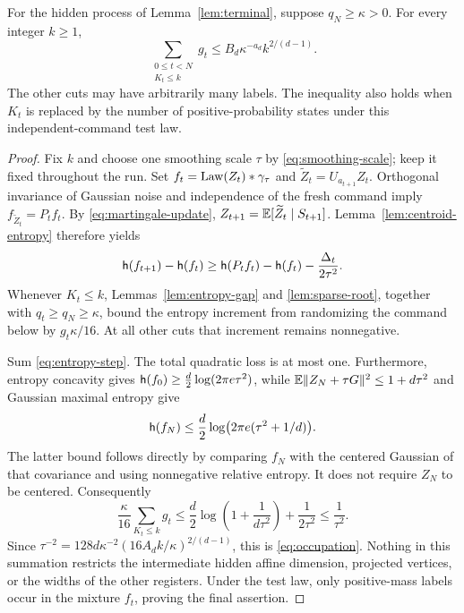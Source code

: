 \begin{theorem}
\label{thm:occupation}
For the hidden process of Lemma~\ref{lem:terminal}, suppose
$q_N\ge\kappa>0$. For every integer $k\ge1$,
\begin{equation}\label{eq:occupation}
 \sum_{\substack{0\le t<N\\K_t\le k}}g_t
       \le B_d\kappa^{-a_d}k^{2/(d-1)}.
\end{equation}
The other cuts may have arbitrarily many labels. The inequality also
holds when $K_t$ is replaced by the number of positive-probability
states under this independent-command test law.
\end{theorem}
\begin{proof}
Fix $k$ and choose one smoothing scale $\tau$ by
\eqref{eq:smoothing-scale}; keep it fixed throughout the run. Set
$f_t=\operatorname{Law}(Z_t)*\gamma_\tau$ and
$\widetilde Z_t=U_{a_{t+1}}Z_t$. Orthogonal invariance of Gaussian noise
and independence of the fresh command imply
$f_{\widetilde Z_t}=P_tf_t$.
By \eqref{eq:martingale-update},
$Z_{t+1}=\mathbb E[\widetilde Z_t\mid S_{t+1}]$.
Lemma~\ref{lem:centroid-entropy} therefore yields
\begin{equation}\label{eq:entropy-step}
 \mathsf h(f_{t+1})-\mathsf h(f_t)
 \ge \mathsf h(P_tf_t)-\mathsf h(f_t)-\frac{\Delta_t}{2\tau^2}.
\end{equation}
Whenever $K_t\le k$, Lemmas~\ref{lem:entropy-gap} and
\ref{lem:sparse-root}, together with $q_t\ge q_N\ge\kappa$, bound the
entropy increment from randomizing the command below by $g_t\kappa/16$.
At all other cuts that increment remains nonnegative.

Sum \eqref{eq:entropy-step}. The total quadratic loss is at most one.
Furthermore, entropy concavity gives
$\mathsf h(f_0)\ge\frac d2\log(2\pi e\tau^2)$, while
$\mathbb E\lVert Z_N+\tau G\rVert^2\le1+d\tau^2$ and Gaussian maximal entropy give
\[
 \mathsf h(f_N)\le\frac d2\log\bigl(2\pi e(\tau^2+1/d)\bigr).
\]
The latter bound follows directly by comparing $f_N$ with the centered
Gaussian of that covariance and using nonnegative relative entropy.
It does not require $Z_N$ to be centered. Consequently
\begin{equation}\label{eq:finite-entropy-budget}
 \frac\kappa{16}\sum_{K_t\le k}g_t
 \le\frac d2\log\left(1+\frac1{d\tau^2}\right)
                  +\frac1{2\tau^2}
 \le\frac1{\tau^2}.
\end{equation}
Since
$\tau^{-2}=128d\kappa^{-2}(16A_dk/\kappa)^{2/(d-1)}$,
this is \eqref{eq:occupation}. Nothing in this summation restricts the
intermediate hidden affine dimension, projected vertices, or the widths
of the other registers. Under the test law, only positive-mass labels
occur in the mixture $f_t$, proving the final assertion.
\end{proof}

